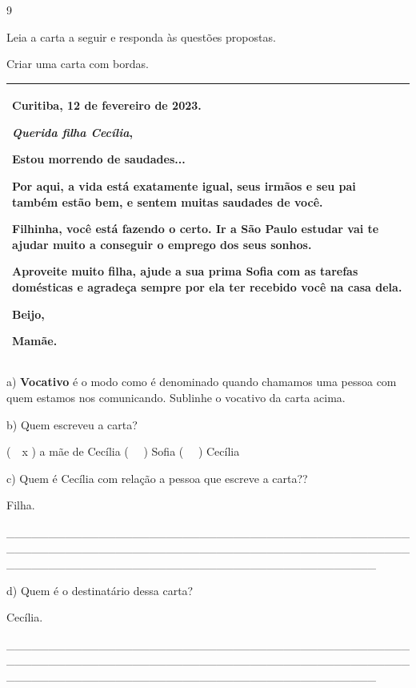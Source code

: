 \begin{itemize}
\num{9}

Leia a carta a seguir e responda às questões propostas.

Criar uma carta com bordas.

\begin{longtable}[]{@{}l@{}}
\toprule
\begin{minipage}[t]{0.97\columnwidth}\raggedright\strut
Curitiba, 12 de fevereiro de 2023.

\emph{Querida filha Cecília},

Estou morrendo de saudades...

Por aqui, a vida está exatamente igual, seus irmãos e seu pai também
estão bem, e sentem muitas saudades de você.

Filhinha, você está fazendo o certo. Ir a São Paulo estudar vai te
ajudar muito a conseguir o emprego dos seus sonhos.

Aproveite muito filha, ajude a sua prima Sofia com as tarefas domésticas
e agradeça sempre por ela ter recebido você na casa dela.

Beijo,

Mamãe.\strut
\end{minipage}\tabularnewline
\bottomrule
\end{longtable}

a) \textbf{Vocativo} é o modo como é denominado quando chamamos uma
pessoa com quem estamos nos comunicando. Sublinhe o vocativo da carta
acima.

b) Quem escreveu a carta?

(~~x ) a mãe de Cecília (~~ ) Sofia (~~ ) Cecília

c) Quem é Cecília com relação a pessoa que escreve a carta??

Filha.

\_\_\_\_\_\_\_\_\_\_\_\_\_\_\_\_\_\_\_\_\_\_\_\_\_\_\_\_\_\_\_\_\_\_\_\_\_\_\_\_\_\_\_\_\_\_\_\_\_\_\_\_\_\_\_\_\_\_\_\_\_\_\_\_\_\_\_\_\_\_\_\_\_\_\_\_\_\_\_\_\_\_\_\_\_\_\_\_\_\_\_\_\_\_\_\_\_\_\_\_\_\_\_\_\_\_\_\_\_\_\_\_\_\_\_\_\_\_\_\_\_\_\_\_\_\_\_\_\_\_\_\_\_\_\_\_\_\_\_\_

d) Quem é o destinatário dessa carta?

Cecília.

\_\_\_\_\_\_\_\_\_\_\_\_\_\_\_\_\_\_\_\_\_\_\_\_\_\_\_\_\_\_\_\_\_\_\_\_\_\_\_\_\_\_\_\_\_\_\_\_\_\_\_\_\_\_\_\_\_\_\_\_\_\_\_\_\_\_\_\_\_\_\_\_\_\_\_\_\_\_\_\_\_\_\_\_\_\_\_\_\_\_\_\_\_\_\_\_\_\_\_\_\_\_\_\_\_\_\_\_\_\_\_\_\_\_\_\_\_\_\_\_\_\_\_\_\_\_\_\_\_\_\_\_\_\_\_\_\_\_\_\_


\end{itemize}
